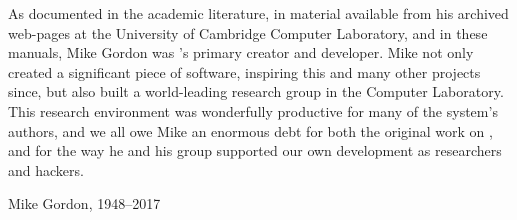 As documented in the academic literature, in material available from his archived web-pages at the University of Cambridge Computer Laboratory, and in these manuals, Mike Gordon was \HOL's primary creator and developer.
Mike not only created a significant piece of software, inspiring this and many other projects since, but also built a world-leading research group in the Computer Laboratory.
This research environment was wonderfully productive for many of the system's authors, and we all owe Mike an enormous debt for both the original work on \HOL, and for the way he and his group supported our own development as researchers and \HOL{} hackers.

\bigskip
\begin{center}
Mike Gordon, 1948--2017
\end{center}
